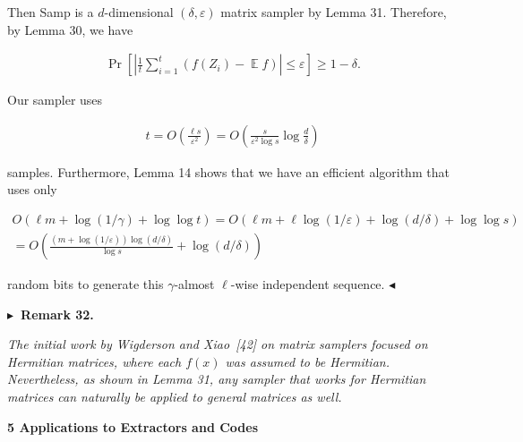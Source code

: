 Then Samp is a $d$-dimensional $(\delta,\varepsilon)$ matrix sampler by Lemma 31.
Therefore, by Lemma 30, we have\par


\[\begin{gathered}
\Pr\left[\left|\frac{1}{t}\sum_{i=1}^{t}(f(Z_{i})-\operatorname*{\mathbb{E}}f)\right|\leq\varepsilon\right]\geq 1-\delta.
\end{gathered}\]


Our sampler uses\par


\[\begin{gathered}
t=O\left(\frac{\ell s}{\varepsilon^{2}}\right)=O\left(\frac{s}{\varepsilon^{2}\log s}\log\frac{d}{\delta}\right)
\end{gathered}\]


samples.
Furthermore, Lemma 14 shows that we have an efficient algorithm that uses only\par


\[\begin{gathered}
\displaystyle O(\ell m+\log(1/\gamma)+\log\log t) \displaystyle=O\left(\ell m+\ell\log(1/\varepsilon)+\log(d/\delta)+\log\log s\right) \\
\displaystyle=O\left(\frac{(m+\log(1/\varepsilon))\log(d/\delta)}{\log s}+\log(d/\delta)\right)
\end{gathered}\]


random bits to generate this $\gamma$-almost $\ell$-wise independent sequence.
$\blacktriangleleft$\par





\par\medskip\noindent\textbf{
$\blacktriangleright$ Remark 32.
}\par



\emph{The initial work by Wigderson and Xiao [42] on matrix samplers focused on Hermitian matrices, where each $f(x)$ was assumed to be Hermitian. Nevertheless, as shown in Lemma 31, any sampler that works for Hermitian matrices can naturally be applied to general matrices as well.}\par










\par\medskip\noindent\textbf{
5 Applications to Extractors and Codes}\par




